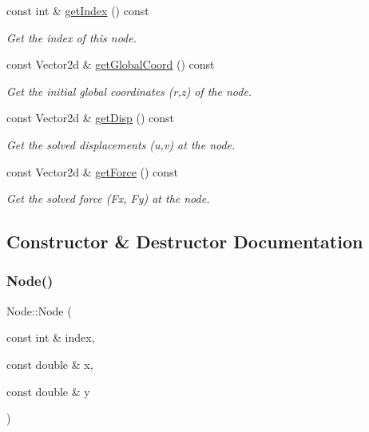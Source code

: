 \begin{DoxyCompactItemize}
const int \& \mbox{\hyperlink{class_node_a8266479b3d82c502d7b4abc5afccb8c0}{get\+Index}} () const
\begin{DoxyCompactList}\small\item\em Get the index of this node. \end{DoxyCompactList}\item 
const Vector2d \& \mbox{\hyperlink{class_node_ab0129116eb1cff646bd53b8120cd34e6}{get\+Global\+Coord}} () const
\begin{DoxyCompactList}\small\item\em Get the initial global coordinates (r,z) of the node. \end{DoxyCompactList}\item 
const Vector2d \& \mbox{\hyperlink{class_node_a2024b690427f7840b18dc429d4acba7d}{get\+Disp}} () const
\begin{DoxyCompactList}\small\item\em Get the solved displacements (u,v) at the node. \end{DoxyCompactList}\item 
const Vector2d \& \mbox{\hyperlink{class_node_acb1728229a234694419ecda6ad5928c4}{get\+Force}} () const
\begin{DoxyCompactList}\small\item\em Get the solved force (Fx, Fy) at the node. \end{DoxyCompactList}\end{DoxyCompactItemize}


\subsection{Constructor \& Destructor Documentation}
\mbox{\label{class_node_a7dd5e46921c9aa573f8167e1f3d0acaa}} 
\subsubsection{\texorpdfstring{Node()}{Node()}}
{\footnotesize\ttfamily Node\+::\+Node (\begin{DoxyParamCaption}\item[{const int \&}]{index,  }\item[{const double \&}]{x,  }\item[{const double \&}]{y }\end{DoxyParamCaption})}



